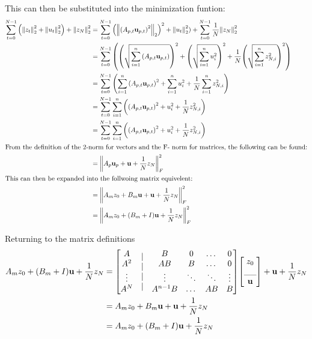 \documentclass[letter]{article}
\begin{document}
This can then be substituted into the minimization funtion:
\begin{align*}
	\sum_{t=0}^{N-1} \qty(\norm{z_t}_2^2 + \norm{u_t}_2^2) + \norm{z_N}_2^2
	&= \sum_{t=0}^{N-1} \qty(\norm{\qty(A_{p,t} \vb{u}_{p,t})^2}_2)^2 + \norm{u_t}_2^2) + \sum_{t=0}^{N-1} \frac{1}{N} \norm{z_N}_2^2\\
	&= \sum_{t=0}^{N-1} \qty( \qty(\sqrt{\sum_{i=1}^{n} \qty(A_{p,t} \vb{u}_{p,t})})^2 + \qty(\sqrt{\sum_{i=1}^{n} u_{i}^2})^2 + \frac{1}{N} \qty(\sqrt{\sum_{i=1}^{n} z_{N,i}^2})^2)\\
	&= \sum_{t=0}^{N-1} \qty(\sum_{i=1}^{n} \qty(A_{p,t} \vb{u}_{p,t})^2 + \sum_{i=1}^{n} u_{i}^2  + \frac{1}{N} \sum_{i=1}^{n} z_{N,i}^2)\\
	&= \sum_{t=0}^{N-1} \sum_{i=1}^{n} \qty( \qty(A_{p,t} \vb{u}_{p,t})^2 + u_{i}^2 + \frac{1}{N} z_{N,i}^2)\\
	&= \sum_{t=0}^{N-1} \sum_{i=1}^{n} \qty( \qty(A_{p,t} \vb{u}_{p,t})^2 + u_{i}^2 + \frac{1}{N} z_{N,i}^2)\\
\intertext{From the definition of the 2-norm for vectors and the F- norm for matrices, the following can be found:}
	&= \norm{A_p\vb{u}_p + \vb{u} + \frac{1}{N} z_N}_F^2\\
\intertext{This can then be expanded into the follwoing matrix equivelent:}
	&= \norm{A_m z_0 + B_m\vb{u} + \vb{u} + \frac{1}{N} z_N}_F^2\\
	&= \norm{A_m z_0 + \qty(B_m + I) \vb{u} + \frac{1}{N} z_N }_F^2
\end{align*}

Returning to the matrix definitions
\begin{align*}
	A_m z_0 + \qty(B_m + I) \vb{u} + \frac{1}{N} z_N
	&= \mqty[\mqty{A \\ A^2 \\ \vdots \\ A^N} 
			& \mqty{|\\|\\|\\|} 
			& \mqty{B 	& 0 & \dots & 0\\
				AB 	& B & \dots & 0\\
				\vdots & \ddots &\ddots &\vdots\\
				A^{n-1}B &\dots &AB &B}]
		\mqty[z_0\\ \_\_ \\ \vb{u}] + \vb{u} + \frac{1}{N} z_N\\
	&= A_m z_0 + B_m \vb{u} + \vb{u} + \frac{1}{N} z_N\\
	&= A_m z_0 + \qty(B_m + I) \vb{u} + \frac{1}{N} z_N
\end{align*}
\end{document}
